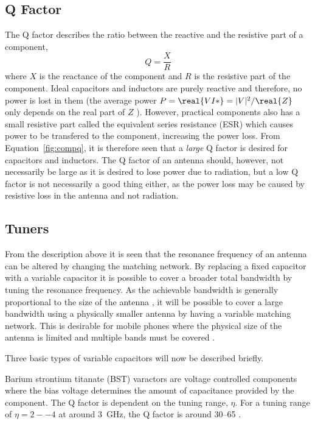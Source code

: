 \subsection{Q Factor}
The Q factor describes the ratio between the reactive and the resistive part of a component,
\begin{equation}
    \label{fig:compq}
    Q = \frac{X}{R}
\end{equation}
where $X$ is the reactance of the component and $R$ is the resistive part of the component. Ideal capacitors and inductors are purely reactive and therefore, no power is lost in them (the average power $P = \real{VI*} = |V|^2 / \real{Z}$ only depends on the real part of $Z$ \cite{irwin2011engineering}). However, practical components also has a small resistive part called the equivalent series resistance (ESR) which causes power to be transfered to the component, increasing the power loss. From Equation~\ref{fig:compq}, it is therefore seen that a \emph{large} Q factor is desired for capacitors and inductors. The Q factor of an antenna should, however, not necessarily be large as it is desired to lose power due to radiation, but a low Q factor is not necessarily a good thing either, as the power loss may be caused by resistive loss in the antenna and not radiation.

\subsection{Tuners}
From the description above it is seen that the resonance frequency of an antenna can be altered by changing the matching network. By replacing a fixed capacitor with a variable capacitor it is possible to cover a broader total bandwidth by tuning the resonance frequency. As the achievable bandwidth is generally proportional to the size of the antenna , it will be possible to cover a large bandwidth using a physically smaller antenna by having a variable matching network. This is desirable for mobile phones where the physical size of the antenna is limited and multiple bands must be covered \cite{gu2014rf}.

Three basic types of variable capacitors will now be described briefly. 

Barium strontium titanate (BST) varactors are voltage controlled components where the bias voltage determines the amount of capacitance provided by the component. The Q factor is dependent on the tuning range, $\eta$. For a tuning range of $\eta = 2--4$ at around \SI{3}{GHz}, the Q factor is around 30--65 \cite{gu2014rf}. 

